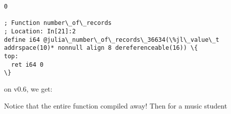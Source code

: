 \documentclass[11pt]{article}
\newenvironment{Shaded}{}{}
\newcommand{\DataTypeTok}[1]{\textcolor[rgb]{0.56,0.13,0.00}{{#1}}}
\newcommand{\FloatTok}[1]{\textcolor[rgb]{0.25,0.63,0.44}{{#1}}}
\newcommand{\CommentTok}[1]{\textcolor[rgb]{0.38,0.63,0.69}{\textit{{#1}}}}
\newcommand{\NormalTok}[1]{{#1}}
\begin{document}
    \begin{Verbatim}[commandchars=\\\{\}]
0

; Function number\_of\_records
; Location: In[21]:2
define i64 @julia\_number\_of\_records\_36634(\%jl\_value\_t addrspace(10)* nonnull align 8 dereferenceable(16)) \{
top:
  ret i64 0
\}

    \end{Verbatim}

    on v0.6, we get:

\begin{Shaded}
\end{Shaded}

Notice that the entire function compiled away! Then for a music student
\end{document}
